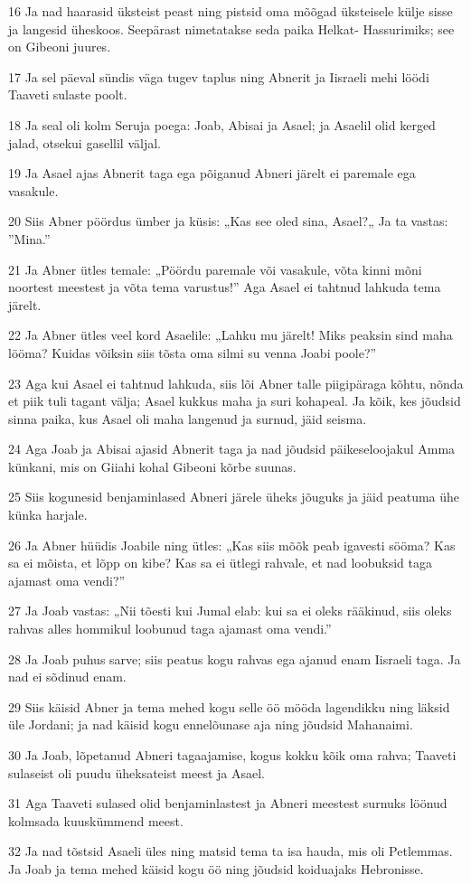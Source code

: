 \par 16 Ja nad haarasid üksteist peast ning pistsid oma mõõgad üksteisele külje sisse ja langesid üheskoos. Seepärast nimetatakse seda paika Helkat- Hassurimiks; see on Gibeoni juures.
\par 17 Ja sel päeval sündis väga tugev taplus ning Abnerit ja Iisraeli mehi löödi Taaveti sulaste poolt.
\par 18 Ja seal oli kolm Seruja poega: Joab, Abisai ja Asael; ja Asaelil olid kerged jalad, otsekui gasellil väljal.
\par 19 Ja Asael ajas Abnerit taga ega põiganud Abneri järelt ei paremale ega vasakule.
\par 20 Siis Abner pöördus ümber ja küsis: „Kas see oled sina, Asael?„ Ja ta vastas: ”Mina.”
\par 21 Ja Abner ütles temale: „Pöördu paremale või vasakule, võta kinni mõni noortest meestest ja võta tema varustus!” Aga Asael ei tahtnud lahkuda tema järelt.
\par 22 Ja Abner ütles veel kord Asaelile: „Lahku mu järelt! Miks peaksin sind maha lööma? Kuidas võiksin siis tõsta oma silmi su venna Joabi poole?”
\par 23 Aga kui Asael ei tahtnud lahkuda, siis lõi Abner talle piigipäraga kõhtu, nõnda et piik tuli tagant välja; Asael kukkus maha ja suri kohapeal. Ja kõik, kes jõudsid sinna paika, kus Asael oli maha langenud ja surnud, jäid seisma.
\par 24 Aga Joab ja Abisai ajasid Abnerit taga ja nad jõudsid päikeseloojakul Amma künkani, mis on Giiahi kohal Gibeoni kõrbe suunas.
\par 25 Siis kogunesid benjaminlased Abneri järele üheks jõuguks ja jäid peatuma ühe künka harjale.
\par 26 Ja Abner hüüdis Joabile ning ütles: „Kas siis mõõk peab igavesti sööma? Kas sa ei mõista, et lõpp on kibe? Kas sa ei ütlegi rahvale, et nad loobuksid taga ajamast oma vendi?”
\par 27 Ja Joab vastas: „Nii tõesti kui Jumal elab: kui sa ei oleks rääkinud, siis oleks rahvas alles hommikul loobunud taga ajamast oma vendi.”
\par 28 Ja Joab puhus sarve; siis peatus kogu rahvas ega ajanud enam Iisraeli taga. Ja nad ei sõdinud enam.
\par 29 Siis käisid Abner ja tema mehed kogu selle öö mööda lagendikku ning läksid üle Jordani; ja nad käisid kogu ennelõunase aja ning jõudsid Mahanaimi.
\par 30 Ja Joab, lõpetanud Abneri tagaajamise, kogus kokku kõik oma rahva; Taaveti sulaseist oli puudu üheksateist meest ja Asael.
\par 31 Aga Taaveti sulased olid benjaminlastest ja Abneri meestest surnuks löönud kolmsada kuuskümmend meest.
\par 32 Ja nad tõstsid Asaeli üles ning matsid tema ta isa hauda, mis oli Petlemmas. Ja Joab ja tema mehed käisid kogu öö ning jõudsid koiduajaks Hebronisse.

